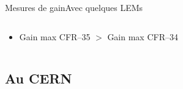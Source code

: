 \begin{frame}{Mesures de gain}{Avec quelques LEMs}
\begin{scriptsize}
\begin{columns}
\begin{column}{0.58\textwidth}
\begin{itemize}
    					\item  Gain max CFR--35 $>$ Gain max CFR--34
    				\end{itemize}
    			\end{column}
    		\end{columns}
    	\end{scriptsize}
    \end{frame}
    
    \subsection{Au CERN}

    {
    	\setlength\pdfpagewidth{12.8cm}%
    	\setlength\pdfpageheight{9cm}%
    	\begin{frame}[plain]
    	\end{frame}
    }
    {
       	\setlength\pdfpagewidth{12.8cm}%
       	\setlength\pdfpageheight{9cm}%
       	\begin{frame}[plain]
       	\end{frame}
    }

